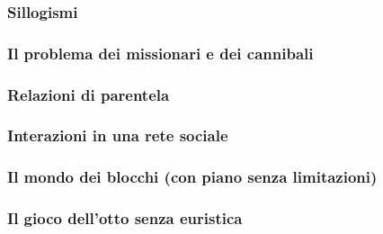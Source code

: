 

\subsubsection{Sillogismi}



\vspace{1cm}
\subsubsection{Il problema dei missionari e dei cannibali}



\vspace{1cm}
\subsubsection{Relazioni di parentela}



\vspace{1cm}
\subsubsection{Interazioni in una rete sociale}



\vspace{1cm}
\subsubsection{Il mondo dei blocchi (con piano senza limitazioni)}



\vspace{1cm}
\subsubsection{Il gioco dell'otto senza euristica}

